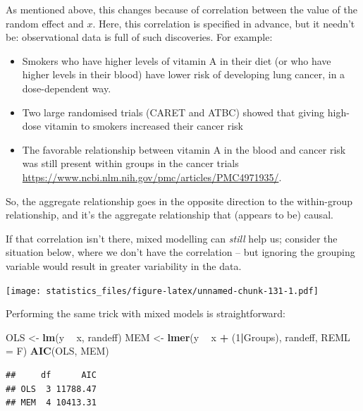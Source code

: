 \documentclass[]{book}
\newenvironment{Shaded}{\begin{snugshade}}{\end{snugshade}}
\newcommand{\DataTypeTok}[1]{\textcolor[rgb]{0.13,0.29,0.53}{#1}}
\newcommand{\DecValTok}[1]{\textcolor[rgb]{0.00,0.00,0.81}{#1}}
\newcommand{\KeywordTok}[1]{\textcolor[rgb]{0.13,0.29,0.53}{\textbf{#1}}}
\newcommand{\NormalTok}[1]{#1}
\newcommand{\OperatorTok}[1]{\textcolor[rgb]{0.81,0.36,0.00}{\textbf{#1}}}
\newcommand{\StringTok}[1]{\textcolor[rgb]{0.31,0.60,0.02}{#1}}
\providecommand{\tightlist}{%
  \setlength{\itemsep}{0pt}\setlength{\parskip}{0pt}}
\begin{document}
As mentioned above, this changes because of correlation between the value of the random effect and \(x\). Here, this correlation is specified in advance, but it needn't be: observational data is full of such discoveries. For example:

\begin{itemize}
\tightlist
\item
  Smokers who have higher levels of vitamin A in their diet (or who have higher levels in their blood) have lower risk of developing lung cancer, in a dose-dependent way.
\item
  Two large randomised trials (CARET and ATBC) showed that giving high-dose vitamin to smokers increased their cancer risk
\item
  The favorable relationship between vitamin A in the blood and cancer risk was still present within groups in the cancer trials \href{(example\%20link)}{https://www.ncbi.nlm.nih.gov/pmc/articles/PMC4971935/}.
\end{itemize}

So, the aggregate relationship goes in the opposite direction to the within-group relationship, and it's the aggregate relationship that (appears to be) causal.

If that correlation isn't there, mixed modelling can \emph{still} help us; consider the situation below, where we don't have the correlation -- but ignoring the grouping variable would result in greater variability in the data.

\texttt{[image: statistics\_files/figure-latex/unnamed-chunk-131-1.pdf]}

Performing the same trick with mixed models is straightforward:

\begin{Shaded}
\begin{Highlighting}[]
\NormalTok{OLS <-}\StringTok{ }\KeywordTok{lm}\NormalTok{(y }\OperatorTok{~}\StringTok{ }\NormalTok{x, randeff)}
\NormalTok{MEM <-}\StringTok{ }\KeywordTok{lmer}\NormalTok{(y }\OperatorTok{~}\StringTok{ }\NormalTok{x }\OperatorTok{+}\StringTok{ }\NormalTok{(}\DecValTok{1}\OperatorTok{|}\NormalTok{Groups), randeff, }\DataTypeTok{REML =}\NormalTok{ F)}
\KeywordTok{AIC}\NormalTok{(OLS, MEM)}
\end{Highlighting}
\end{Shaded}

\begin{verbatim}
##     df      AIC
## OLS  3 11788.47
## MEM  4 10413.31
\end{verbatim}
\end{document}
